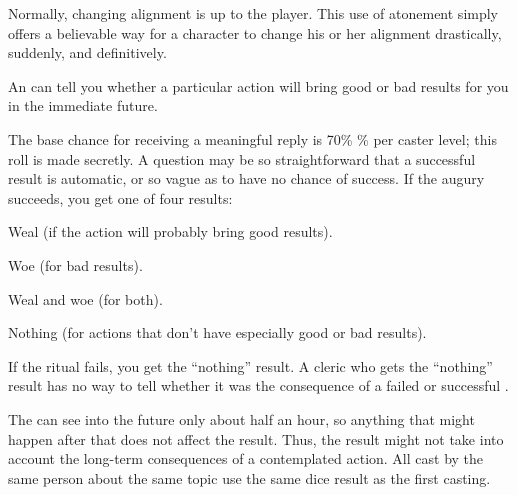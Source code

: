 \begin{spellnotes}
\par {} Normally, changing alignment is up to the player. This use of atonement simply offers a believable way for a character to change his or her alignment drastically, suddenly, and definitively.
\end{spellnotes}

\begin{spelleffect}
An  can tell you whether a particular action will bring good or bad results for you in the immediate future.
\par The base chance for receiving a meaningful reply is 70\% \% per caster level; this roll is made secretly. A question may be so straightforward that a successful result is automatic, or so vague as to have no chance of success. If the augury succeeds, you get one of four results:
\begin{itemize*}
\item Weal (if the action will probably bring good results).
\item Woe (for bad results).
\item Weal and woe (for both).
\item Nothing (for actions that don't have especially good or bad results).
\end{itemize*}
\par If the ritual fails, you get the ``nothing'' result. A cleric who gets the ``nothing'' result has no way to tell whether it was the consequence of a failed or successful .
\par The  can see into the future only about half an hour, so anything that might happen after that does not affect the result. Thus, the result might not take into account the long-term consequences of a contemplated action. All  cast by the same person about the same topic use the same dice result as the first casting.
\end{spelleffect}

